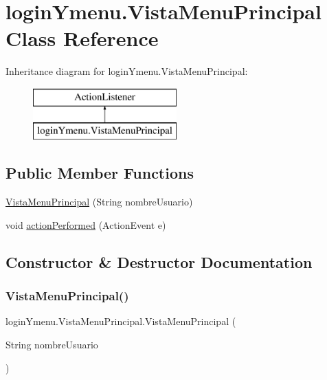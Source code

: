 \hypertarget{classlogin_ymenu_1_1_vista_menu_principal}{}\section{login\+Ymenu.\+Vista\+Menu\+Principal Class Reference}
\label{classlogin_ymenu_1_1_vista_menu_principal}
Inheritance diagram for login\+Ymenu.\+Vista\+Menu\+Principal\+:\begin{figure}[H]
\begin{center}
\leavevmode
\includegraphics[height=2.000000cm]{classlogin_ymenu_1_1_vista_menu_principal}
\end{center}
\end{figure}
\subsection*{Public Member Functions}
\begin{DoxyCompactItemize}
\item 
\mbox{\hyperlink{classlogin_ymenu_1_1_vista_menu_principal_accce31638dbe1c715560488f2a719170}{Vista\+Menu\+Principal}} (String nombre\+Usuario)
\item 
void \mbox{\hyperlink{classlogin_ymenu_1_1_vista_menu_principal_a094c4e6f06a9fa0cf575ca550a22560f}{action\+Performed}} (Action\+Event e)
\end{DoxyCompactItemize}


\subsection{Constructor \& Destructor Documentation}
\mbox{\label{classlogin_ymenu_1_1_vista_menu_principal_accce31638dbe1c715560488f2a719170}} 
\subsubsection{\texorpdfstring{Vista\+Menu\+Principal()}{VistaMenuPrincipal()}}
{\footnotesize\ttfamily login\+Ymenu.\+Vista\+Menu\+Principal.\+Vista\+Menu\+Principal (\begin{DoxyParamCaption}\item[{String}]{nombre\+Usuario }\end{DoxyParamCaption})}



